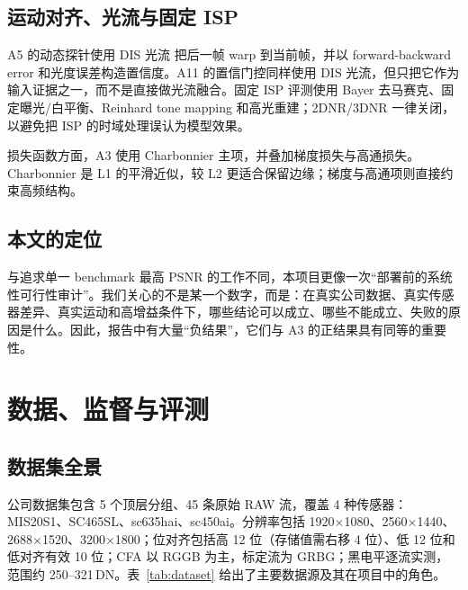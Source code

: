 \documentclass[11pt,a4paper,UTF8,fontset=fandol]{ctexart}
\newcommand{\dn}{\ensuremath{\,\mathrm{DN}}}
\begin{document}
\subsection{运动对齐、光流与固定 ISP}

A5 的动态探针使用 DIS 光流\cite{r11} 把后一帧 warp 到当前帧，并以 forward-backward error 和光度误差构造置信度。A11 的置信门控同样使用 DIS 光流，但只把它作为输入证据之一，而不是直接做光流融合。固定 ISP 评测使用 Bayer 去马赛克、固定曝光/白平衡、Reinhard tone mapping\cite{r12} 和高光重建；2DNR/3DNR 一律关闭，以避免把 ISP 的时域处理误认为模型效果。

损失函数方面，A3 使用 Charbonnier 主项\cite{r13}，并叠加梯度损失与高通损失。Charbonnier 是 L1 的平滑近似，较 L2 更适合保留边缘；梯度与高通项则直接约束高频结构。

\subsection{本文的定位}

与追求单一 benchmark 最高 PSNR 的工作不同，本项目更像一次“部署前的系统性可行性审计”。我们关心的不是某一个数字，而是：在真实公司数据、真实传感器差异、真实运动和高增益条件下，哪些结论可以成立、哪些不能成立、失败的原因是什么。因此，报告中有大量“负结果”，它们与 A3 的正结果具有同等的重要性。

\section{数据、监督与评测}

\subsection{数据集全景}

公司数据集包含 5 个顶层分组、45 条原始 RAW 流，覆盖 4 种传感器：MIS20S1、SC465SL、sc635hai、sc450ai。分辨率包括 1920$\times$1080、2560$\times$1440、2688$\times$1520、3200$\times$1800；位对齐包括高 12 位（存储值需右移 4 位）、低 12 位和低对齐有效 10 位；CFA 以 RGGB 为主，标定流为 GRBG；黑电平逐流实测，范围约 250--321\dn。表~\ref{tab:dataset} 给出了主要数据源及其在项目中的角色。
\end{document}
